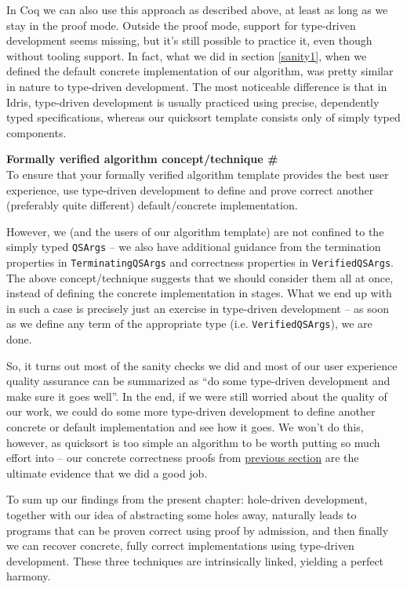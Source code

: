 \documentclass[declaration,mgr,english,shortabstract]{iithesis}
\newcommand{\m}[1]{\texttt{#1}}
\newcounter{cnt}
\newcommand{\runcnt}{\#\arabic{cnt}}
\newcommand{\concept}[1]
{
    \refstepcounter{cnt}
    \begin{center}
        \textbf{Formally verified algorithm concept/technique \runcnt} \\
        #1
    \end{center}
}
\begin{document}
In Coq we can also use this approach as described above, at least as long as we stay in the proof mode. Outside the proof mode, support for type-driven development seems missing, but it's still possible to practice it, even though without tooling support. In fact, what we did in section \ref{sanity1}, when we defined the default concrete implementation of our algorithm, was pretty similar in nature to type-driven development. The most noticeable difference is that in Idris, type-driven development is usually practiced using precise, dependently typed specifications, whereas our quicksort template consists only of simply typed components.

\concept{To ensure that your formally verified algorithm template provides the best user experience, use type-driven development to define and prove correct another (preferably quite different) default/concrete implementation.}

However, we (and the users of our algorithm template) are not confined to the simply typed \m{QSArgs} -- we also have additional guidance from the termination properties in \m{TerminatingQSArgs} and correctness properties in \m{VerifiedQSArgs}. The above concept/technique suggests that we should consider them all at once, instead of defining the concrete implementation in stages. What we end up with in such a case is precisely just an exercise in type-driven development -- as soon as we define any term of the appropriate type (i.e. \m{VerifiedQSArgs}), we are done.

So, it turns out most of the sanity checks we did and most of our user experience quality assurance can be summarized as ``do some type-driven development and make sure it goes well''. In the end, if we were still worried about the quality of our work, we could do some more type-driven development to define another concrete or default implementation and see how it goes. We won't do this, however, as quicksort is too simple an algorithm to be worth putting so much effort into -- our concrete correctness proofs from \hyperref[sanity3]{previous section} are the ultimate evidence that we did a good job.

To sum up our findings from the present chapter: hole-driven development, together with our idea of abstracting some holes away, naturally leads to programs that can be proven correct using proof by admission, and then finally we can recover concrete, fully correct implementations using type-driven development. These three techniques are intrinsically linked, yielding a perfect harmony.
\end{document}
